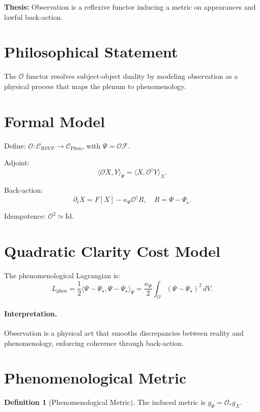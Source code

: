 \documentclass[12pt]{book}
\theoremstyle{definition}
\newtheorem{definition}{Definition}[chapter]
\begin{document}
\textbf{Thesis:} Observation is a reflexive functor inducing a metric on appearances and lawful back-action.

\section{Philosophical Statement}
The \(\mathcal{O}\) functor resolves subject-object duality by modeling observation as a physical process that maps the plenum to phenomenology.

\section{Formal Model}
Define: \(\mathcal{O}: \mathcal{C}_{\text{RSVP}} \to \mathcal{C}_{\text{Phen}}\), with \(\Psi = \mathcal{O} \mathcal{F}\).

Adjoint:
\begin{equation}
\langle \mathcal{O}X, Y \rangle_\Psi = \langle X, \mathcal{O}^\dagger Y \rangle_X.
\end{equation}

Back-action:
\begin{equation}
\partial_t X = F[X] - \kappa_\Psi \mathcal{O}^\dagger R, \quad R = \Psi - \Psi_\star.
\end{equation}

Idempotence: \(\mathcal{O}^2 \simeq \text{Id}\).

\section{Quadratic Clarity Cost Model}
The phenomenological Lagrangian is:
\begin{equation}
L_{\text{phen}} = \frac{1}{2} \langle \Psi - \Psi_\star, \Psi - \Psi_\star \rangle_\Psi = \frac{\kappa_\Psi}{2} \int_\Omega (\Psi - \Psi_\star)^2 \, dV.
\end{equation}

\paragraph{Interpretation.} Observation is a physical act that smooths discrepancies between reality and phenomenology, enforcing coherence through back-action.

\section{Phenomenological Metric}
\begin{definition}[Phenomenological Metric]
\label{def:pheno_metric}
The induced metric is \(g_\Psi = \mathcal{O}_* g_X\).
\end{definition}
\end{document}
